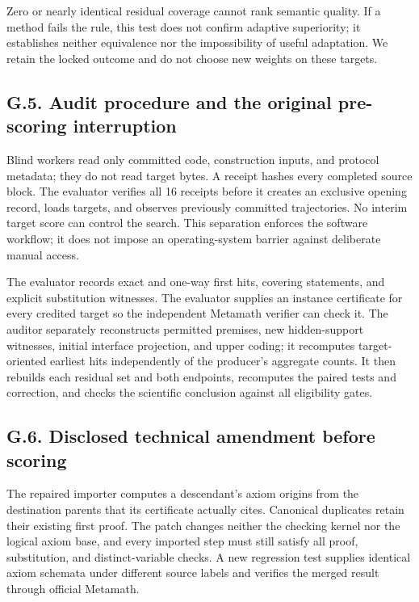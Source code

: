 \documentclass[pdflatex,sn-basic,Numbered]{sn-jnl}
\begin{document}
Zero or nearly identical residual coverage cannot rank semantic quality. If a method fails the rule, this test does not confirm adaptive superiority; it establishes neither equivalence nor the impossibility of useful adaptation. We retain the locked outcome and do not choose new weights on these targets.

\subsection*{G.5. Audit procedure and the original pre-scoring interruption}\label{g.5.-audit-procedure-and-the-original-pre-scoring-interruption}

Blind workers read only committed code, construction inputs, and protocol metadata; they do not read target bytes. A receipt hashes every completed source block. The evaluator verifies all 16 receipts before it creates an exclusive opening record, loads targets, and observes previously committed trajectories. No interim target score can control the search. This separation enforces the software workflow; it does not impose an operating-system barrier against deliberate manual access.

The evaluator records exact and one-way first hits, covering statements, and explicit substitution witnesses. The evaluator supplies an instance certificate for every credited target so the independent Metamath verifier can check it. The auditor separately reconstructs permitted premises, new hidden-support witnesses, initial interface projection, and upper coding; it recomputes target-oriented earliest hits independently of the producer's aggregate counts. It then rebuilds each residual set and both endpoints, recomputes the paired tests and correction, and checks the scientific conclusion against all eligibility gates.

\subsection*{G.6. Disclosed technical amendment before scoring}\label{g.6.-disclosed-technical-amendment-before-scoring}

The repaired importer computes a descendant's axiom origins from the destination parents that its certificate actually cites. Canonical duplicates retain their existing first proof. The patch changes neither the checking kernel nor the logical axiom base, and every imported step must still satisfy all proof, substitution, and distinct-variable checks. A new regression test supplies identical axiom schemata under different source labels and verifies the merged result through official Metamath.
\end{document}
